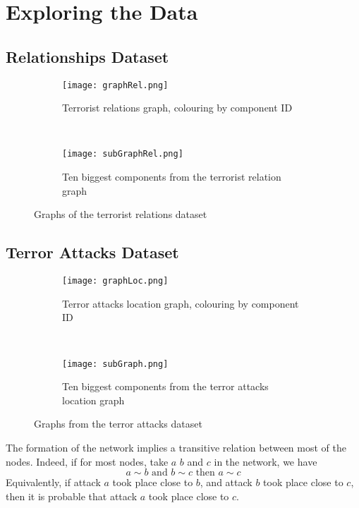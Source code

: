 \section{Exploring the Data}
\label{sec:Exploring the Data}

\subsection{Relationships Dataset}
\label{subsec:Relationships Dataset}

\begin{figure}[H]
\begin{center}
    \begin{subfigure}[b]{0.45\textwidth}
        \texttt{[image: graphRel.png]}
        \caption{Terrorist relations graph, colouring by component ID}
        \label{fig:graphLoc}
    \end{subfigure}
    ~
    \begin{subfigure}[b]{0.45\textwidth}
        \texttt{[image: subGraphRel.png]}
        \caption{Ten biggest components from the terrorist relation graph}
        \label{fig:subGraph}
    \end{subfigure}
\caption{Graphs of the terrorist relations dataset}
\label{fig:graphPlots}
\end{center}
\end{figure}

\subsection{Terror Attacks Dataset}
\label{subsec:Terror Attacks Dataset}

\begin{figure}[H]
\begin{center}
    \begin{subfigure}[b]{0.45\textwidth}
        \texttt{[image: graphLoc.png]}
        \caption{Terror attacks location graph, colouring by component ID}
        \label{fig:graphLoc}
    \end{subfigure}
    ~
    \begin{subfigure}[b]{0.45\textwidth}
        \texttt{[image: subGraph.png]}
        \caption{Ten biggest components from the terror attacks location graph}
        \label{fig:subGraph}
    \end{subfigure}
\caption{Graphs from the terror attacks dataset}
\label{fig:graphPlots}
\end{center}
\end{figure}
The formation of the network implies a transitive relation between most of the nodes. Indeed, if for most nodes, take $a$ $b$ and $c$ in the network, we have
\begin{equation}
a \sim b \text{ and } b \sim c \text{ then } a \sim c 
\end{equation}
Equivalently, if attack $a$ took place close to $b$, and attack $b$ took place close to $c$, then it is probable that attack $a$ took place close to $c$.